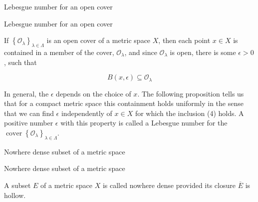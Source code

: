 \documentclass[17pt]{extarticle}
\renewcommand{\bar}[1]{\overline{#1}}
\newcommand{\boxset}[2]{\begin{mdframed}[style=darkQuesion]
#1
\end{mdframed}
\newpage
\begin{mdframed}[style=darkQuesion]
#1
  \end{mdframed}
\begin{mdframed}[style=darkAnswer]
#2
  \end{mdframed}
  \newpage
}
\begin{document}
\boxset{Lebesgue number for an open cover}
{
If $\left\{\mathcal{O}_{\lambda}\right\}_{\lambda \in \Lambda}$ is an open cover of a metric space $X$, then each point $x \in X$ is contained in a member of the cover, $\mathcal{O}_{\lambda}$, and since $\mathcal{O}_{\lambda}$ is open, there is some $\epsilon>0$, such that

\[
B(x, \epsilon) \subseteq \mathcal{O}_{\lambda}
\]

In general, the $\epsilon$ depends on the choice of $x$. The following proposition tells us that for a compact metric space this containment holds uniformly in the sense that we can find $\epsilon$ independently of $x \in X$ for which the inclusion (4) holds. A positive number $\epsilon$ with this property is called a Lebesgue number for the $\operatorname{cover}\left\{\mathcal{O}_{\lambda}\right\}_{\lambda \in \Lambda}$.
}
\boxset{Nowhere dense subset of a metric space}
{
A subset $E$ of a metric space $X$ is called nowhere dense provided its closure $\bar{E}$ is hollow.
}
\end{document}
